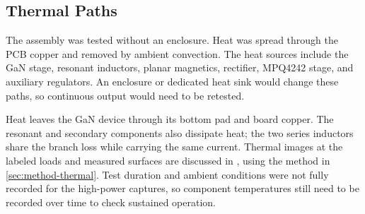 \subsection{Thermal Paths}
\label{sec:hw-thermal}

The assembly was tested without an enclosure. Heat was spread through the PCB copper and removed by ambient convection. The heat sources include the GaN stage, resonant inductors, planar magnetics, rectifier, MPQ4242 stage, and auxiliary regulators. An enclosure or dedicated heat sink would change these paths, so continuous output would need to be retested.

Heat leaves the GaN device through its bottom pad and board copper. The resonant and secondary components also dissipate heat; the two series inductors share the branch loss while carrying the same current. Thermal images at the labeled loads and measured surfaces are discussed in , using the method in \cref{sec:method-thermal}. Test duration and ambient conditions were not fully recorded for the high-power captures, so component temperatures still need to be recorded over time to check sustained operation.
